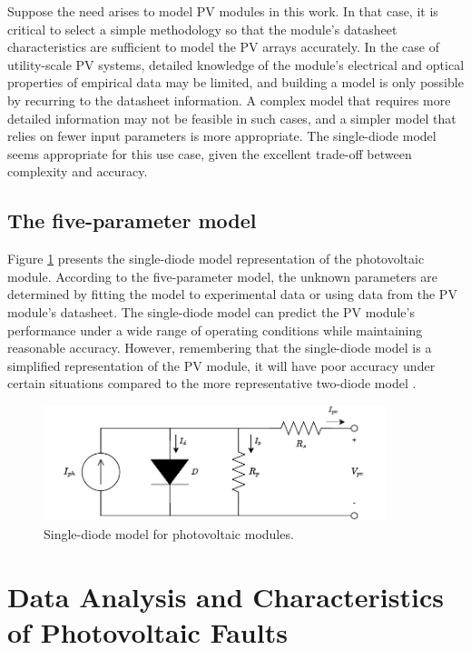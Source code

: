 Suppose the need arises to model PV modules in this work. In that case, it is critical to select a simple methodology so that the module's datasheet characteristics are sufficient to model the PV arrays accurately. In the case of utility-scale PV systems, detailed knowledge of the module's electrical and optical properties of empirical data may be limited, and building a model is only possible by recurring to the datasheet information. A complex model that requires more detailed information may not be feasible in such cases, and a simpler model that relies on fewer input parameters is more appropriate. The single-diode model seems appropriate for this use case, given the excellent trade-off between complexity and accuracy.

\subsection{The five-parameter model}

Figure \ref{fig:onediodedraw} presents the single-diode model representation of the photovoltaic module. According to the five-parameter model, the unknown parameters are determined by fitting the model to experimental data or using data from the PV module's datasheet. The single-diode model can predict the PV module's performance under a wide range of operating conditions while maintaining reasonable accuracy. However, remembering that the single-diode model is a simplified representation of the PV module, it will have poor accuracy under certain situations compared to the more representative two-diode model \cite{Godina2017}.

\begin{figure}[H]
    \centering
    \includegraphics[width=10cm]{figures/chapter2/onediode.drawio.pdf} \caption{Single-diode model for photovoltaic modules.}
    \label{fig:onediodedraw}
\end{figure}

\section{Data Analysis and Characteristics of Photovoltaic Faults}

